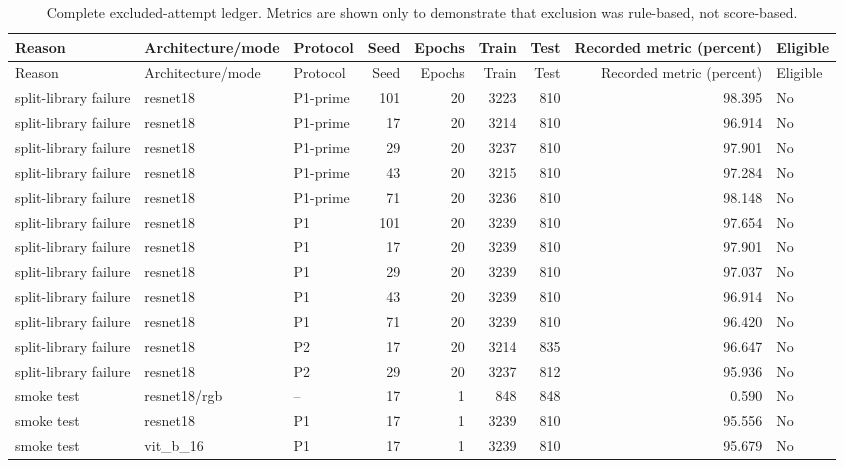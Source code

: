 \begin{longtable}{p{3.7cm}p{3.3cm}p{1.5cm}rrrrrp{1.2cm}}
\caption{Complete excluded-attempt ledger. Metrics are shown only to demonstrate that exclusion was rule-based, not score-based.}\label{s1:tab:invalid-attempts}\\
\toprule
Reason & Architecture/mode & Protocol & Seed & Epochs & Train & Test & Recorded metric (percent) & Eligible \\
\midrule
\endfirsthead
\toprule
Reason & Architecture/mode & Protocol & Seed & Epochs & Train & Test & Recorded metric (percent) & Eligible \\
\midrule
\endhead
\bottomrule
\endfoot
split-library failure & resnet18 & P1-prime & 101 & 20 & 3223 & 810 & 98.395 & No \\ 
split-library failure & resnet18 & P1-prime & 17 & 20 & 3214 & 810 & 96.914 & No \\ 
split-library failure & resnet18 & P1-prime & 29 & 20 & 3237 & 810 & 97.901 & No \\ 
split-library failure & resnet18 & P1-prime & 43 & 20 & 3215 & 810 & 97.284 & No \\ 
split-library failure & resnet18 & P1-prime & 71 & 20 & 3236 & 810 & 98.148 & No \\ 
split-library failure & resnet18 & P1 & 101 & 20 & 3239 & 810 & 97.654 & No \\ 
split-library failure & resnet18 & P1 & 17 & 20 & 3239 & 810 & 97.901 & No \\ 
split-library failure & resnet18 & P1 & 29 & 20 & 3239 & 810 & 97.037 & No \\ 
split-library failure & resnet18 & P1 & 43 & 20 & 3239 & 810 & 96.914 & No \\ 
split-library failure & resnet18 & P1 & 71 & 20 & 3239 & 810 & 96.420 & No \\ 
split-library failure & resnet18 & P2 & 17 & 20 & 3214 & 835 & 96.647 & No \\ 
split-library failure & resnet18 & P2 & 29 & 20 & 3237 & 812 & 95.936 & No \\ 
smoke test & resnet18/rgb & -- & 17 & 1 & 848 & 848 & 0.590 & No \\ 
smoke test & resnet18 & P1 & 17 & 1 & 3239 & 810 & 95.556 & No \\ 
smoke test & vit\_b\_16 & P1 & 17 & 1 & 3239 & 810 & 95.679 & No \\ 
\end{longtable}

